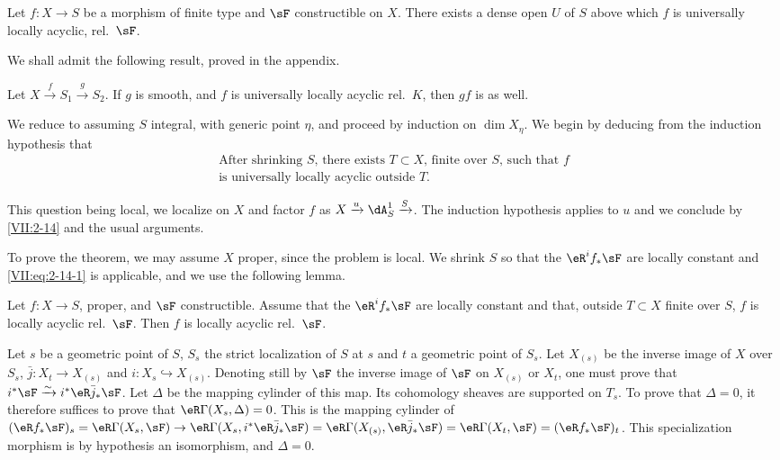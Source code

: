 \begin{theorem_}\label{VII:2-13}
Let $f:X\to S$ be a morphism of finite type and $\sF$ constructible on $X$. There
exists a dense open $U$ of $S$ above which $f$ is universally
locally acyclic, rel.\ $\sF$.
\end{theorem_}

We shall admit the following result, proved in the appendix.




\begin{lemma_}\label{VII:2-14}
Let $X\xrightarrow f S_1 \xrightarrow g S_2$. If $g$ is smooth, and $f$
is universally locally acyclic rel.\ $K$, then $g f$ is as well.
\end{lemma_}

We reduce to assuming $S$ integral, with generic point $\eta$, and
proceed by induction on $\dim{X_\eta}$. We begin by deducing from the
induction hypothesis that
\begin{equation*}\tag{A}\label{VII:eq:2-14-1}
  \begin{array}{c}
    \text{After shrinking $S$, there exists $T\subset X$, finite over $S$, such that $f$} \\
    \text{is universally locally acyclic outside $T$.}
  \end{array}
\end{equation*}

This question being local, we localize on $X$ and factor $f$ as
$X\xrightarrow u \dA_S^1 \xrightarrow S$. The induction hypothesis
applies to $u$ and we conclude by \ref{VII:2-14} and the usual arguments.

To prove the theorem, we may assume $X$ proper, since the
problem is local. We shrink $S$ so that the $\eR^i f_\ast \sF$
are locally constant and \eqref{VII:eq:2-14-1} is applicable, and we
use the following lemma.




\begin{lemma_}\label{VII:2-15}
Let $f:X\to S$, proper, and $\sF$ constructible. Assume that the
$\eR^i f_\ast \sF$ are locally constant and that, outside $T\subset X$
finite over $S$, $f$ is locally acyclic rel.\ $\sF$. Then $f$ is
locally acyclic rel.\ $\sF$.
\end{lemma_}

Let $s$ be a geometric point of $S$, $S_s$ the strict localization of $S$
at $s$ and $t$ a geometric point of $S_s$. Let $X_{(s)}$ be the
inverse image of $X$ over $S_s$, $\bar j:X_t \to X_{(s)}$ and
$i:X_s \hookrightarrow X_{(s)}$. Denoting still by $\sF$ the inverse image of
$\sF$ on $X_{(s)}$ or $X_t$, one must prove that
$i^\ast \sF \iso i^\ast \eR \bar j_\ast \sF$. Let $\Delta$ be the mapping cylinder
of this map. Its cohomology sheaves are supported on $T_s$.
To prove that $\Delta=0$, it therefore suffices to prove that
$\eR\Gamma(X_s,\Delta)=0$. This is the mapping cylinder of
$(\eR f_\ast \sF)_s = \eR\Gamma(X_s,\sF) \to \eR\Gamma(X_s,i^\ast \eR\bar j_\ast \sF) = \eR\Gamma(X_{(s)},\eR\bar j_\ast \sF) = \eR\Gamma(X_t,\sF) = (\eR f_\ast \sF)_t$.
This specialization morphism is by hypothesis an isomorphism, and
$\Delta=0$.




